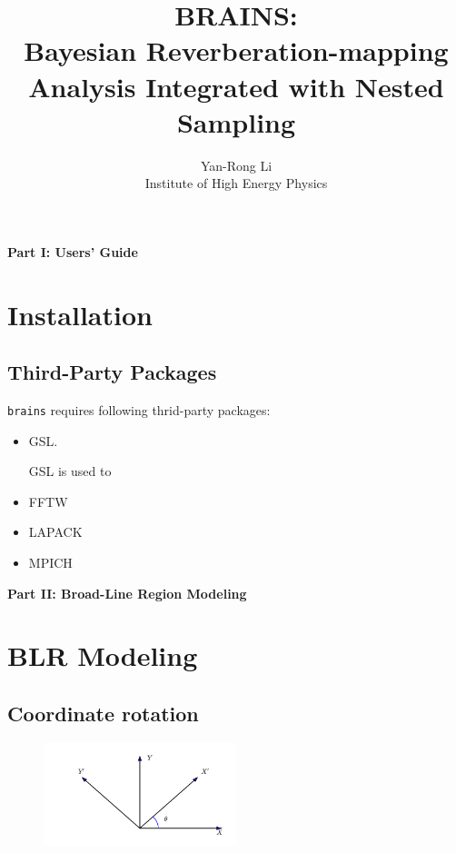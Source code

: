 \documentclass[oneside]{book}
\def\brains{{\texttt{brains}}}
\begin{document}
\title{\bf BRAINS:\\
Bayesian Reverberation-mapping Analysis Integrated
with Nested Sampling}
\author{Yan-Rong Li\\
Institute of High Energy Physics}

\maketitle
\tableofcontents
\mainmatter

\clearpage
\newpage

\vspace*{10cm}
{\Huge\centerline{\bf Part I: Users' Guide}}


\chapter{Installation}
\section{Third-Party Packages}
{\brains} requires following thrid-party packages:
\begin{itemize}
 \item GSL.
 
 GSL is used to 
 \item FFTW
 \item LAPACK
 \item MPICH
\end{itemize}


\clearpage
\newpage

\vspace*{10cm}
{\Huge\centerline{\bf Part II: Broad-Line Region Modeling}}

\setcounter{chapter}{0}
\chapter{BLR Modeling}

\section{Coordinate rotation}
\begin{figure}[h!]
\centering
\includegraphics[width=0.5\textwidth]{coord.pdf}
\end{figure}
\end{document}
